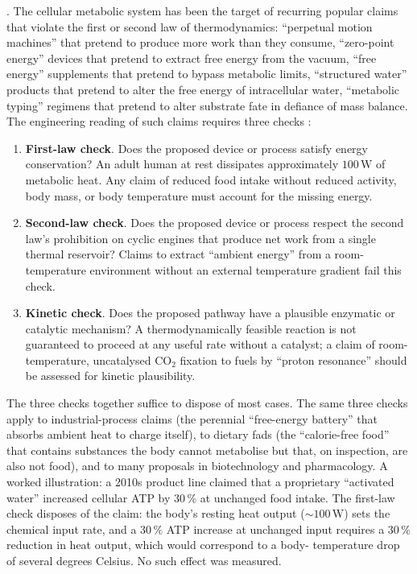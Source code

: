 . The cellular
metabolic system has been the target of recurring popular claims that
violate the first or second law of thermodynamics: ``perpetual motion
machines'' that pretend to produce more work than they consume,
``zero-point energy'' devices that pretend to extract free energy from
the vacuum, ``free energy'' supplements that pretend to bypass
metabolic limits, ``structured water'' products that pretend to alter
the free energy of intracellular water, ``metabolic typing'' regimens
that pretend to alter substrate fate in defiance of mass balance. The
engineering reading of such claims requires three checks
\cite{text:v6c02-callen-thermodynamics-1985}:

\begin{enumerate}[leftmargin=*]
\item \textbf{First-law check}. Does the proposed device or process
  satisfy energy conservation? An adult human at rest dissipates
  approximately $100\,\text{W}$ of metabolic heat. Any claim of
  reduced food intake without reduced activity, body mass, or body
  temperature must account for the missing energy.
\item \textbf{Second-law check}. Does the proposed device or process
  respect the second law's prohibition on cyclic engines that produce
  net work from a single thermal reservoir? Claims to extract
  ``ambient energy'' from a room-temperature environment without an
  external temperature gradient fail this check.
\item \textbf{Kinetic check}. Does the proposed pathway have a plausible
  enzymatic or catalytic mechanism? A thermodynamically feasible
  reaction is not guaranteed to proceed at any useful rate without
  a catalyst; a claim of room-temperature, uncatalysed CO$_2$ fixation
  to fuels by ``proton resonance'' should be assessed for kinetic
  plausibility.
\end{enumerate}

The three checks together suffice to dispose of most cases. The same
three checks apply to industrial-process claims (the perennial
``free-energy battery'' that absorbs ambient heat to charge itself),
to dietary fads (the ``calorie-free food'' that contains substances
the body cannot metabolise but that, on inspection, are also not food),
and to many proposals in biotechnology and pharmacology. A worked
illustration: a 2010s product line claimed that a proprietary
``activated water'' increased cellular ATP by $30\,\%$ at unchanged
food intake. The first-law check disposes of the claim: the body's
resting heat output ($\sim 100\,\text{W}$) sets the chemical input
rate, and a $30\,\%$ ATP increase at unchanged input requires a
$30\,\%$ reduction in heat output, which would correspond to a body-
temperature drop of several degrees Celsius. No such effect was
measured.

